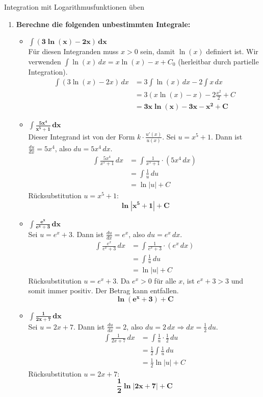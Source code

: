 \begin{loesungsumgebung}{Integration mit Logarithmusfunktionen üben}

\begin{enumerate}[label=(\alph*)]
    \item \textbf{Berechne die folgenden unbestimmten Integrale:}
    \begin{itemize}
        \item $\mathbf{\int (3\ln(x) - 2x) \,dx}$ \\
        Für diesen Integranden muss $x>0$ sein, damit $\ln(x)$ definiert ist.
        Wir verwenden $\int \ln(x) \,dx = x\ln(x) - x + C_0$ (herleitbar durch partielle Integration).
        \begin{align*} \int (3\ln(x) - 2x) \,dx &= 3\int \ln(x) \,dx - 2\int x \,dx \\ &= 3(x\ln(x) - x) - 2\frac{x^2}{2} + C \\ &= \mathbf{3x\ln(x) - 3x - x^2 + C} \end{align*}

        \item $\mathbf{\int \frac{5x^4}{x^5+1} \,dx}$ \\
        Dieser Integrand ist von der Form $k \cdot \frac{u'(x)}{u(x)}$.
        Sei $u = x^5+1$. Dann ist $\frac{du}{dx} = 5x^4$, also $du = 5x^4 \,dx$.
        \begin{align*} \int \frac{5x^4}{x^5+1} \,dx &= \int \frac{1}{x^5+1} \cdot (5x^4 \,dx) \\ &= \int \frac{1}{u} \,du \\ &= \ln|u| + C \end{align*}
        Rücksubstitution $u=x^5+1$:
        $$ \mathbf{\ln|x^5+1| + C} $$

        \item $\mathbf{\int \frac{e^x}{e^x+3} \,dx}$ \\
        Sei $u = e^x+3$. Dann ist $\frac{du}{dx} = e^x$, also $du = e^x \,dx$.
        \begin{align*} \int \frac{e^x}{e^x+3} \,dx &= \int \frac{1}{e^x+3} \cdot (e^x \,dx) \\ &= \int \frac{1}{u} \,du \\ &= \ln|u| + C \end{align*}
        Rücksubstitution $u=e^x+3$. Da $e^x > 0$ für alle $x$, ist $e^x+3 > 3$ und somit immer positiv. Der Betrag kann entfallen.
        $$ \mathbf{\ln(e^x+3) + C} $$

        \item $\mathbf{\int \frac{1}{2x+7} \,dx}$ \\
        Sei $u = 2x+7$. Dann ist $\frac{du}{dx} = 2$, also $du = 2 \,dx \Rightarrow dx = \frac{1}{2} \,du$.
        \begin{align*} \int \frac{1}{2x+7} \,dx &= \int \frac{1}{u} \cdot \frac{1}{2} \,du \\ &= \frac{1}{2} \int \frac{1}{u} \,du \\ &= \frac{1}{2}\ln|u| + C \end{align*}
        Rücksubstitution $u=2x+7$:
        $$ \mathbf{\frac{1}{2}\ln|2x+7| + C} $$
    \end{itemize}


\end{enumerate}
\end{loesungsumgebung}
